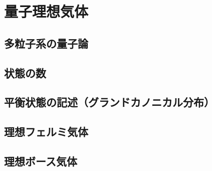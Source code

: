 \documentclass[a4paper]{jsreport}
\begin{document}
    \chapter{量子理想気体}
        \section{多粒子系の量子論}
        \section{状態の数}
        \section{平衡状態の記述（グランドカノニカル分布）}
        \section{理想フェルミ気体}
        \section{理想ボース気体}
        
\end{document}
